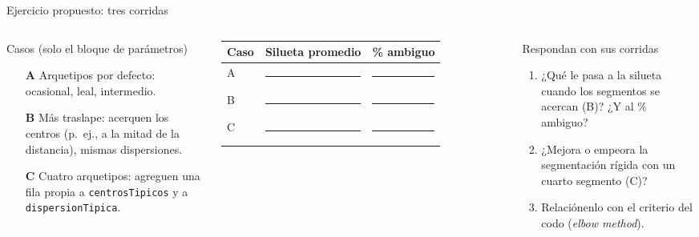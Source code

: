 \documentclass[aspectratio=169,xcolor=dvipsnames]{beamer}
\begin{document}
\begin{frame}{Ejercicio propuesto: tres corridas}
\begin{columns}[T]
  \begin{exampleblock}{Casos (solo el bloque de parámetros)}
    \scriptsize
    \begin{itemize}
      \item[\textbf{A}] Arquetipos por defecto: ocasional, leal, intermedio.
      \item[\textbf{B}] Más traslape: acerquen los centros (p.\ ej., a la mitad de la distancia), mismas dispersiones.
      \item[\textbf{C}] Cuatro arquetipos: agreguen una fila propia a \texttt{centrosTipicos} y a \texttt{dispersionTipica}.
    \end{itemize}
  \end{exampleblock}
  \footnotesize
  \begin{tabular}{@{}lcc@{}}
    \toprule
    Caso & Silueta promedio & \% ambiguo \\
    \midrule
    A & \rule{1.3cm}{0.4pt} & \rule{1.3cm}{0.4pt} \\[2pt]
    B & \rule{1.3cm}{0.4pt} & \rule{1.3cm}{0.4pt} \\[2pt]
    C & \rule{1.3cm}{0.4pt} & \rule{1.3cm}{0.4pt} \\
    \bottomrule
  \end{tabular}
  \vspace{2pt}
  \begin{block}{Respondan con sus corridas}
    \scriptsize
    \begin{enumerate}
      \item ¿Qué le pasa a la silueta cuando los segmentos se acercan (B)? ¿Y al \% ambiguo?
      \item ¿Mejora o empeora la segmentación rígida con un cuarto segmento (C)?
      \item Relaciónenlo con el criterio del codo (\textit{elbow method}).
    \end{enumerate}
  \end{block}
\end{columns}
\end{frame}
\end{document}

